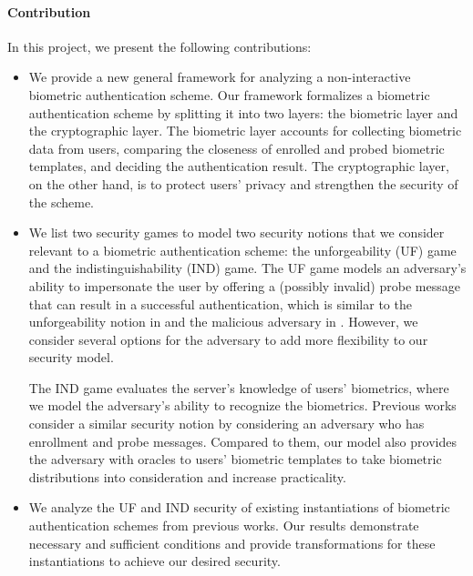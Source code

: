 \paragraph{Contribution}
In this project, we present the following contributions:
\begin{itemize}
	\item We provide a new general framework for analyzing a non-interactive biometric authentication scheme. Our framework formalizes a biometric authentication scheme by splitting it into two layers: the biometric layer and the cryptographic layer. The biometric layer accounts for collecting biometric data from users, comparing the closeness of enrolled and probed biometric templates, and deciding the authentication result. The cryptographic layer, on the other hand, is to protect users' privacy and strengthen the security of the scheme.
	\item We list two security games to model two security notions that we consider relevant to a biometric authentication scheme: the unforgeability (UF) game and the indistinguishability (IND) game. The UF game models an adversary's ability to impersonate the user by offering a (possibly invalid) probe message that can result in a successful authentication, which is similar to the unforgeability notion in \cite{cryptoeprint:2014/394} and the malicious adversary in \cite{cryptoeprint:2023/481}. However, we consider several options for the adversary to add more flexibility to our security model.

	The IND game evaluates the server's knowledge of users' biometrics, where we model the adversary's ability to recognize the biometrics. Previous works \cite{cryptoeprint:2014/394, cryptoeprint:2018/1214, 10.1007/978-3-030-90567-5_33, cryptoeprint:2023/481} consider a similar security notion by considering an adversary who has enrollment and probe messages. Compared to them, our model also provides the adversary with oracles to users' biometric templates to take biometric distributions into consideration and increase practicality.
	
	\item We analyze the UF and IND security of existing instantiations of biometric authentication schemes from previous works. Our results demonstrate necessary and sufficient conditions and provide transformations for these instantiations to achieve our desired security.
\end{itemize}

